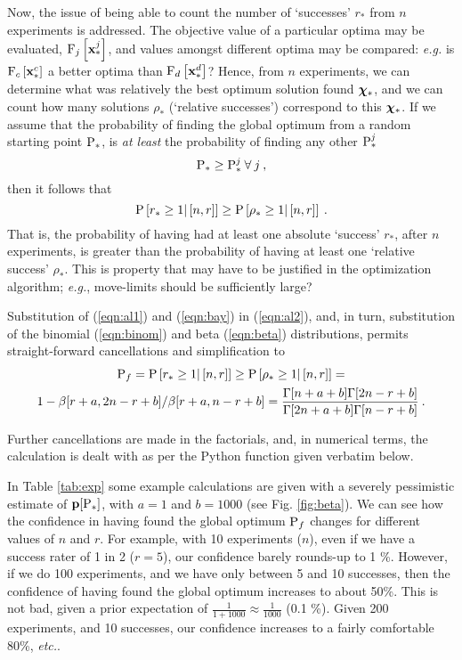 \documentclass[11pt]{article}
\begin{document}
Now, the issue of being able to count the number of `successes' $r_\ast$ from $n$ experiments is addressed. The objective value of a particular optima may be evaluated, $\F_j \left[ \bx^j_\ast \right]$, and values amongst different optima may be compared: \emph{e.g.} is $\F_c \left[ \bx^c_\ast \right]$ a better optima than $\F_d \left[ \bx^d_\ast \right]$? Hence, from $n$ experiments, we can determine what was relatively the best optimum solution found $\bchi_\ast$, and we can count how many solutions $\rho_\ast$ (`relative successes') correspond to this $\bchi_\ast$. If we assume that the probability of finding the global optimum from a random starting point $\P_\ast$, is \emph{at least} the probability of finding any other $\P^j_\ast$
\begin{equation}
\P_\ast \ge \P^j_\ast \: \forall \: j \:,
\end{equation}
then it follows that
\begin{equation}
\P \left[ r_\ast \ge 1 | \left[ n, r \right] \right] \ge \P \left[ \rho_\ast \ge 1 | \left[ n, r \right] \right] \: .
\end{equation}
That is, the probability of having had at least one absolute `success' $r_\ast$, after $n$ experiments, is greater than the probability of having at least one `relative success' $\rho_\ast$. This is property that may have to be justified in the optimization algorithm; \emph{e.g.}, move-limits should be sufficiently large?

Substitution of (\ref{eqn:al1}) and (\ref{eqn:bay}) in (\ref{eqn:al2}), and, in turn, substitution of the binomial (\ref{eqn:binom}) and beta (\ref{eqn:beta}) distributions, permits straight-forward cancellations and simplification \cite{snyman1987} to
\begin{multline}
\label{eqn:res}
\P_f = \P \left[ r_\ast \ge 1 | \left[ n, r \right] \right]  \ge \P \left[ \rho_\ast \ge 1 | \left[ n, r \right] \right] = \\  1 - \beta[r+a,2n-r+b]/\beta[r +a,n-r+b] = \frac{\Gamma[n+a+b]\Gamma[2n-r+b]}{\Gamma[2n+a+b]\Gamma[n-r+b]}\:.
\end{multline}

Further cancellations are made in the factorials, and, in numerical terms, the calculation is dealt with as per the Python function given verbatim below. 

In Table \ref{tab:exp} some example calculations are given with a severely pessimistic estimate of $\p[\P_\ast]$, with $a=1$ and $b=1000$ (see Fig. \ref{fig:beta}). We can see how the confidence in having found the global optimum $\P_f$ changes for different values of $n$ and $r$. For example, with 10 experiments ($n$), even if we have a success rater of 1 in 2 ($r=5$), our confidence barely rounds-up to 1 \%.  However, if we do 100 experiments, and we have only between 5 and 10 successes, then the confidence of having found the global optimum increases to about 50\%. This is not bad, given a prior expectation of $\frac{1}{1 + 1000} \approx \frac{1}{1000}$ (0.1 \%). Given 200 experiments, and 10 successes, our confidence increases to a fairly comfortable 80\%, \emph{etc.}.
\end{document}
